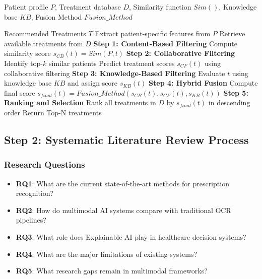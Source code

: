 \documentclass[conference]{IEEEtran}
\newcommand{\REQUIRE}{\item[\textbf{Require:}]}
\newcommand{\ENSURE}{\item[\textbf{Ensure:}]}
\begin{document}
\begin{algorithm}[H]
\caption{Hybrid filtering treatment recommendation}
\label{alg:hybrid}
\begin{algorithmic}[1]
\REQUIRE Patient profile $P$, Treatment database $D$, Similarity function $Sim()$, Knowledge base $KB$, Fusion Method $Fusion\_Method$ \ENSURE Recommended Treatments $T$
\STATE Extract patient-specific features from $P$
\STATE Retrieve available treatments from $D$
\STATE \textbf{Step 1: Content-Based Filtering}
    \STATE Compute similarity score $s_{CB}(t) = Sim(P, t)$
\ENDFOR
\STATE \textbf{Step 2: Collaborative Filtering}
\STATE Identify top-$k$ similar patients
\STATE Predict treatment scores $s_{CF}(t)$ using collaborative filtering
\STATE \textbf{Step 3: Knowledge-Based Filtering}
    \STATE Evaluate $t$ using knowledge base $KB$ and assign score $s_{KB}(t)$
\ENDFOR
\STATE \textbf{Step 4: Hybrid Fusion}
    \STATE Compute final score $s_{final}(t) = Fusion\_Method(s_{CB}(t), s_{CF}(t), s_{KB}(t))$
\ENDFOR
\STATE \textbf{Step 5: Ranking and Selection}
\STATE Rank all treatments in $D$ by $s_{final}(t)$ in descending order
\STATE Return Top-N treatments
\end{algorithmic}
\end{algorithm}


\subsection{Step 2: Systematic Literature Review Process}

\subsubsection{Research Questions}

\begin{itemize}
    \item \textbf{RQ1}: What are the current state-of-the-art methods for prescription recognition?
    \item \textbf{RQ2}: How do multimodal AI systems compare with traditional OCR pipelines?
    \item \textbf{RQ3}: What role does Explainable AI play in healthcare decision systems?
    \item \textbf{RQ4}: What are the major limitations of existing systems?
    \item \textbf{RQ5}: What research gaps remain in multimodal frameworks?
\end{itemize}
\end{document}
